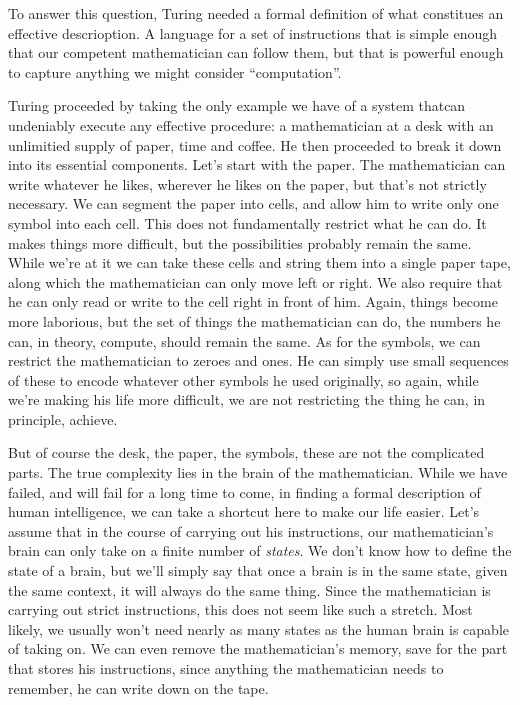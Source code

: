 To answer this question, Turing needed a formal definition of what constitues an effective descrioption. A language for a set of instructions that is simple enough that our competent mathematician can follow them, but that is powerful enough to capture anything we might consider ``computation''. 

Turing proceeded by taking the only example we have of a system thatcan undeniably execute any effective procedure: a mathematician at a desk with an unlimitied supply of paper, time and coffee. He then proceeded to break it down into its essential components. Let's start with the paper. The mathematician can write whatever he likes, wherever he likes on the paper, but that's not strictly necessary. We can segment the paper into cells, and allow him to write only one symbol into each cell. This does not fundamentally restrict what he can do. It makes things more difficult, but the possibilities probably remain the same. While we're at it we can take these cells and string them into a single paper tape, along which the mathematician can only move left or right. We also require that he can only read or write to the cell right in front of him. Again, things become more laborious, but the set of things the mathematician can do, the numbers he can, in theory, compute, should remain the same. As for the symbols, we can restrict the mathematician to zeroes and ones. He can simply use small sequences of these to encode whatever other symbols he used originally, so again, while we're making his life more difficult, we are not restricting the thing he can, in principle, achieve.

But of course the desk, the paper, the symbols, these are not the complicated parts. The true complexity lies in the brain of the mathematician. While we have failed, and will fail for a long time to come, in finding a formal description of human intelligence, we can take a shortcut here to make our life easier. Let's assume that in the course of carrying out his instructions, our mathematician's brain can only take on a finite number of \emph{states}. We don't know how to define the state of a brain, but we'll simply say that once a brain is in the same state, given the same context, it will always do the same thing. Since the mathematician is carrying out strict instructions, this does not seem like such a stretch. Most likely, we usually won't need nearly as many states as the human brain is capable of taking on. We can even remove the mathematician's memory, save for the part that stores his instructions, since anything the mathematician needs to remember, he can write down on the tape.

